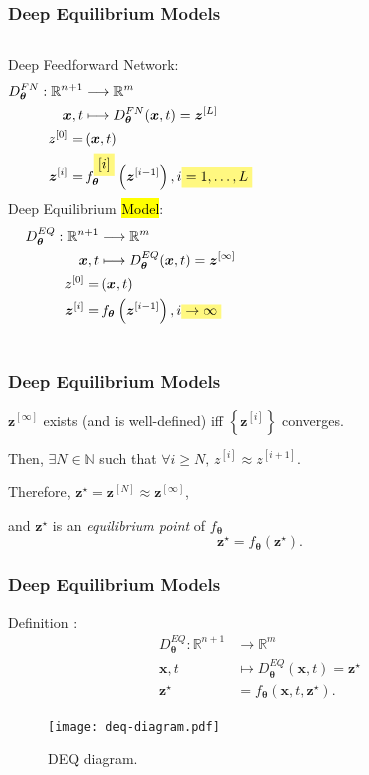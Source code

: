 \documentclass[t]{beamer}
\newcommand{\R}{\mathbb{R}}
\newcommand{\N}{\mathbb{N}}
\newcommand{\highlight}[1]{%
  \colorbox{yellow!50}{$\displaystyle#1$}}
\begin{document}
\begin{frame}
    \frametitle{Deep Equilibrium Models}
    \begin{columns}
	Deep Feedforward Network:
	\begin{align*}
	    D^{FN}_{\bm{\theta}}: \R^{n+1} &\longrightarrow \R^{m} \\
	    \bm{x}, t &\longmapsto D^{FN}_{\bm{\theta}}(\bm{x},t) = \bm{z}^{[L]} \\
	    z^{[0]} =&\, (\bm{x}, t) \\
	    \bm{z}^{[i]} =&\, f^{\highlight{[i]}}_{\bm{\theta}}\left( \bm{z}^{[i-1]} \right) , i\highlight{=1,\ldots,L}
	\end{align*} \pause
	Deep Equilibrium \hl{Model}:
	\begin{align*}
	    D^{EQ}_{\bm{\theta}}: \R^{n+1} &\longrightarrow \R^{m} \\
	    \bm{x}, t &\longmapsto D^{EQ}_{\bm{\theta}}(\bm{x},t) = \bm{z}^{[\infty]} \\
	    z^{[0]} =&\, (\bm{x}, t) \\
	    \bm{z}^{[i]} =&\, f_{\bm{\theta}}\left( \bm{z}^{[i-1]} \right) , i\highlight{\to \infty}
	\end{align*}
    \end{columns}
\end{frame}

\begin{frame}
    \frametitle{Deep Equilibrium Models}
    $\bm{z}^{[\infty]}$ exists (and is well-defined) iff $\left\{  \bm{z}^{[i]} \right\}$ converges.
    \linebreak \pause

    Then, $\exists N\in \N$ such that $\forall i\ge N,\,z^{[i]}\approx z^{[i+1]}$.
    \linebreak \pause

    Therefore, $\bm{z}^{\star}=\bm{z}^{[N]}\approx \bm{z}^{[\infty]}$,
    \linebreak \pause

    and $\bm{z}^{\star}$ is an \emph{equilibrium point} of $f_{\bm{\theta}}$ \[
	    \bm{z}^{\star} = f_{\bm{\theta}}\left( \bm{z}^{\star} \right)
    .\] 
\end{frame}

\begin{frame}
    \frametitle{Deep Equilibrium Models}
    Definition \cite{Bai2019}:
    \begin{align*}
	D^{EQ}_{\bm{\theta}}: \R^{n+1} &\longrightarrow \R^{m} \\
	\bm{x},t &\longmapsto 	D^{EQ}_{\bm{\theta}}(\bm{x},t) = \bm{z}^{\star} \\
	\bm{z}^{\star} &= f_{\bm{\theta}}\left( \bm{x},t, \bm{z}^{\star} \right)
    .\end{align*}

    \pause
    \begin{figure}[h]
        \centering
        \texttt{[image: deq-diagram.pdf]}
        \caption{DEQ diagram.}
        \label{fig:deq-diagram-}
    \end{figure}
\end{frame}
\end{document}
